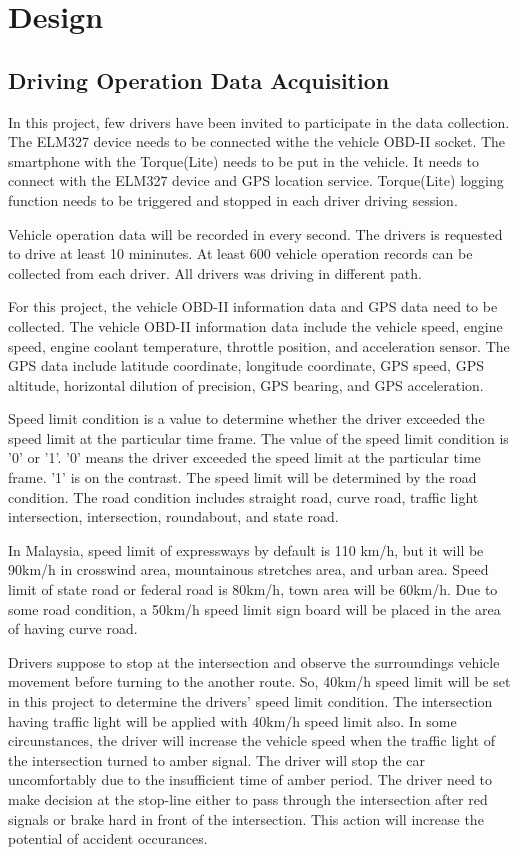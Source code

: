 \chapter{Design}

\section{Driving Operation Data Acquisition}
In this project, few drivers have been invited to participate in the data collection. The ELM327 device needs to be connected withe the vehicle OBD-II socket. The smartphone with the Torque(Lite) needs to be put in the vehicle. It needs to connect with the ELM327 device and GPS location service. Torque(Lite) logging function needs to be triggered and stopped in each driver driving session. 

Vehicle operation data will be recorded in every second. The drivers is requested to drive at least 10 mininutes. At least 600 vehicle operation records can be collected from each driver. All drivers was driving in different path.

For this project, the vehicle OBD-II information data and GPS data need to be collected. The vehicle OBD-II information data include the vehicle speed, engine speed, engine coolant temperature, throttle position, and acceleration sensor. The GPS data include latitude coordinate, longitude coordinate, GPS speed, GPS altitude, horizontal dilution of precision, GPS bearing, and GPS acceleration.

Speed limit condition is a value to determine whether the driver exceeded the speed limit at the particular time frame. The value of the speed limit condition is '0' or '1'. '0' means the driver exceeded the speed limit at the particular time frame. '1' is on the contrast. The speed limit will be determined by the road condition. The road condition includes straight road, curve road, traffic light intersection, intersection, roundabout, and state road. 

In Malaysia, speed limit of expressways by default is 110 km/h, but it will be 90km/h in crosswind area, mountainous stretches area, and urban area. Speed limit of state road or federal road is 80km/h, town area will be 60km/h. Due to some road condition, a 50km/h speed limit sign board will be placed in the area of having curve road. 

Drivers suppose to stop at the intersection and observe the surroundings vehicle movement before turning to the another route. So, 40km/h speed limit will be set in this project to determine the drivers' speed limit condition. The intersection having traffic light will be applied with 40km/h speed limit also. In some circunstances, the driver will increase the vehicle speed when the traffic light of the intersection turned to amber signal. The driver will stop the car uncomfortably due to the insufficient time of amber period. The driver need to make decision at the stop-line either to pass through the intersection after red signals or brake hard in front of the intersection. This action will increase the potential of accident occurances.\cite{kulanthayan:phang:hayati:2007}

